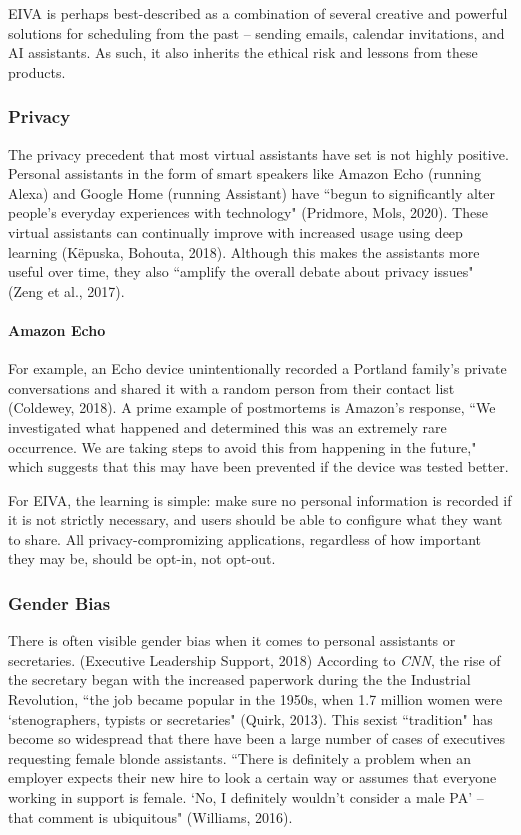 \documentclass{article}
\begin{document}
EIVA is perhaps best-described as a combination of several creative and powerful solutions for scheduling from the past -- sending emails, calendar invitations, and AI assistants. As such, it also inherits the ethical risk and lessons from these products.

\subsubsection{Privacy}

The privacy precedent that most virtual assistants have set is not highly positive. Personal assistants in the form of smart speakers like Amazon Echo (running Alexa) and Google Home (running Assistant) have ``begun to significantly alter people’s everyday experiences with technology" (Pridmore, Mols, 2020). These virtual assistants can continually improve with increased usage using deep learning (Këpuska, Bohouta, 2018). Although this makes the assistants more useful over time, they also ``amplify the overall debate about privacy issues" (Zeng et al., 2017).

\paragraph{Amazon Echo}

For example, an Echo device unintentionally recorded a Portland family's private conversations and shared it with a random person from their contact list (Coldewey, 2018). A prime example of postmortems is Amazon's response, ``We investigated what happened and determined this was an extremely rare occurrence. We are taking steps to avoid this from happening in the future," which suggests that this may have been prevented if the device was tested better.

For EIVA, the learning is simple: make sure no personal information is recorded if it is not strictly necessary, and users should be able to configure what they want to share. All privacy-compromizing applications, regardless of how important they may be, should be opt-in, not opt-out.

\subsubsection{Gender Bias}

There is often visible gender bias when it comes to personal assistants or secretaries. (Executive Leadership Support, 2018) According to \emph{CNN}, the rise of the secretary began with the increased paperwork during the the Industrial Revolution, ``the job became popular in the 1950s, when 1.7 million women were ‘stenographers, typists or secretaries" (Quirk, 2013). This sexist ``tradition" has become so widespread that there have been a large number of cases of executives requesting female blonde assistants. ``There is definitely a problem when an employer expects their new hire to look a certain way or assumes that everyone working in support is female. `No, I definitely wouldn’t consider a male PA' -- that comment is ubiquitous" (Williams, 2016).
\end{document}
